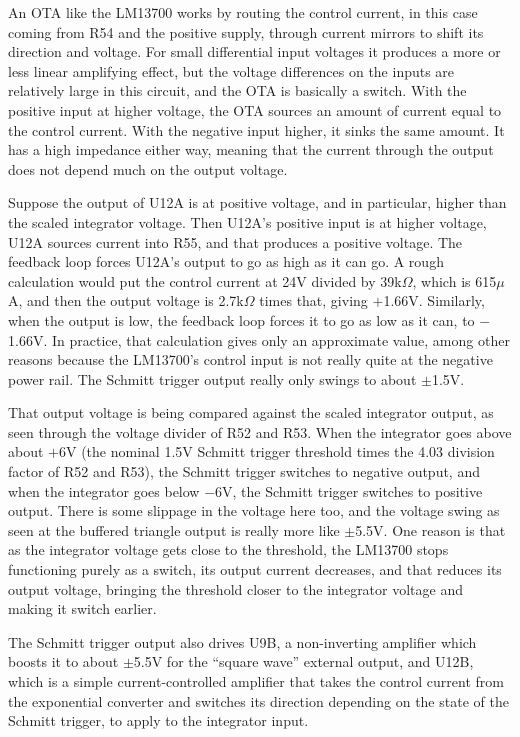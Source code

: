 An OTA like the LM13700 works by routing the control current, in this case
coming from R54 and the positive supply, through current mirrors to shift
its direction and voltage.  For small differential input voltages it
produces a more or less linear amplifying effect, but the voltage
differences on the inputs are relatively large in this circuit, and the OTA
is basically a switch.  With the positive input at higher voltage, the OTA
sources an amount of current equal to the control current.  With the
negative input higher, it sinks the same amount.  It has a high impedance
either way, meaning that the current through the output does not depend much
on the output voltage.

Suppose the output of U12A is at positive voltage, and in particular, higher
than the scaled integrator voltage.  Then U12A's positive input is at higher
voltage, U12A sources current into R55, and that produces a positive
voltage.  The feedback loop forces U12A's output to go as high as it can go. 
A rough calculation would put the control current at 24V divided by
39k$\Omega$, which is 615$\mu$A, and then the output voltage is 2.7k$\Omega$
times that, giving $+$1.66V.  Similarly, when the output is low, the
feedback loop forces it to go as low as it can, to $-$1.66V.  In practice,
that calculation gives only an approximate value, among other reasons
because the LM13700's control input is not really quite at the negative
power rail.  The Schmitt trigger output really only swings to about
$\pm$1.5V.

That output voltage is being compared against the scaled integrator output,
as seen through the voltage divider of R52 and R53.  When the integrator
goes above about $+$6V (the nominal 1.5V Schmitt trigger threshold times the
4.03 division factor of R52 and R53), the Schmitt trigger switches to
negative output, and when the integrator goes below $-$6V, the Schmitt
trigger switches to positive output.  There is some slippage in the voltage
here too, and the voltage swing as seen at the buffered triangle output is
really more like $\pm$5.5V.  One reason is that as the integrator voltage
gets close to the threshold, the LM13700 stops functioning purely as a
switch, its output current decreases, and that reduces its output voltage,
bringing the threshold closer to the integrator voltage and making it switch
earlier.

The Schmitt trigger output also drives U9B, a non-inverting amplifier which
boosts it to about $\pm$5.5V for the ``square wave'' external output, and
U12B, which is a simple current-controlled amplifier that takes the control
current from the exponential converter and switches its direction depending
on the state of the Schmitt trigger, to apply to the integrator input.

